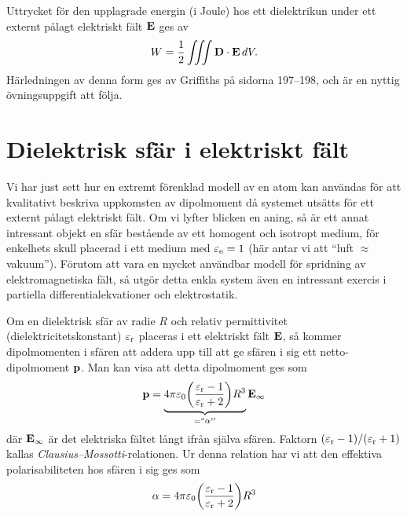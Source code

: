 {{{{{Uttrycket f{\"o}r den upplagrade energin (i Joule) hos ett dielektrikun under
ett externt p{\aa}lagt elektriskt f{\"a}lt ${\bf E}$ ges av
$$
  W = {{1}\over{2}}\iiint{\bf D}\cdot{\bf E}\,dV.
$$
H{\"a}rledningen av denna form ges av Griffiths p{\aa} sidorna 197--198, och
{\"a}r en nyttig {\"o}vningsuppgift att f{\"o}lja.

\section{Dielektrisk sf{\"a}r i elektriskt f{\"a}lt}
Vi har just sett hur en extremt f{\"o}renklad modell av en atom kan anv{\"a}ndas
f{\"o}r att kvalitativt beskriva uppkomsten av dipolmoment d{\aa} systemet
uts{\"a}tts f{\"o}r ett externt p{\aa}lagt elektriskt f{\"a}lt. Om vi lyfter
blicken en aning, s{\aa} {\"a}r ett annat intressant objekt en sf{\"a}r
best{\aa}ende av ett homogent och isotropt medium, f{\"o}r enkelhets skull
placerad i ett medium med $\varepsilon_{\rm e}=1$ (h{\"a}r antar vi att ``luft
$\approx$ vakuum''). F{\"o}rutom att vara en mycket anv{\"a}ndbar modell
f{\"o}r spridning av elektromagnetiska f{\"a}lt, s{\aa} utg{\"o}r detta enkla
system {\"a}ven en intressant exercis i partiella differentialekvationer och
elektrostatik.

Om en dielektrisk sf{\"a}r av radie $R$ och relativ permittivitet
(dielektricitetskonstant) $\varepsilon_{\rm r}$ placeras i ett elektriskt
f{\"a}lt ${\bf E}$, s{\aa} kommer dipolmomenten i sf{\"a}ren att addera upp
till att ge sf{\"a}ren i sig ett netto-dipolmoment ${\bf p}$. Man kan visa att
detta dipolmoment ges som
$$
  {\bf p}=\underbrace{4\pi\varepsilon_0
    \bigg({{\varepsilon_{\rm r}-1}\over{\varepsilon_{\rm r}+2}}\bigg)
      R^3}_{=``\alpha''}{\bf E}_{\infty}
$$
d{\"a}r ${\bf E}_{\infty}$ {\"a}r det elektriska f{\"a}ltet l{\aa}ngt ifr{\aa}n
sj{\"a}lva sf{\"a}ren. Faktorn $(\varepsilon_{\rm r}-1)/(\varepsilon_{\rm r}+1)$
kallas {\it Clausius--Mossotti}-relationen.
Ur denna relation har vi att den effektiva polarisabiliteten
 hos sf{\"a}ren
i sig ges som
$$
  \alpha=4\pi\varepsilon_0
    \bigg({{\varepsilon_{\rm r}-1}\over{\varepsilon_{\rm r}+2}}\bigg) R^3
$$
\vfill\eject

}}}}}

